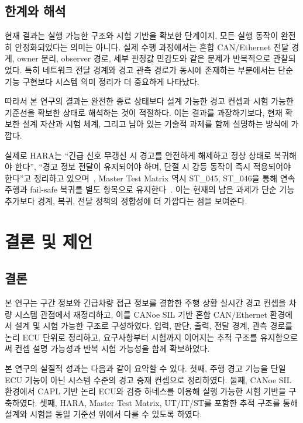 \documentclass[10pt,a4paper,twocolumn]{article}
\begin{document}
\subsection{한계와 해석}

현재 결과는 실행 가능한 구조와 시험 기반을 확보한 단계이지, 모든 실행 동작이 완전히 안정화되었다는 의미는 아니다. 실제 수행 과정에서는 혼합 CAN/Ethernet 전달 경계, owner 분리, observer 경로, 세부 판정값 민감도와 같은 문제가 반복적으로 관찰되었다. 특히 네트워크 전달 경계와 경고 관측 경로가 동시에 존재하는 부분에서는 단순 기능 구현보다 시스템 의미 정리가 더 중요하게 나타났다.

따라서 본 연구의 결과는 완전한 종료 상태보다 설계 가능한 경고 컨셉과 시험 가능한 기준선을 확보한 상태로 해석하는 것이 적절하다. 이는 결과를 과장하기보다, 현재 확보한 설계 자산과 시험 체계, 그리고 남아 있는 기술적 과제를 함께 설명하는 방식에 가깝다.

실제로 HARA는 ``긴급 신호 무갱신 시 경고를 안전하게 해제하고 정상 상태로 복귀해야 한다'', ``경고 정보 전달이 유지되어야 하며, 단절 시 강등 동작이 즉시 적용되어야 한다''고 정리하고 있으며~\cite{hara}, Master Test Matrix 역시 ST\_045, ST\_046을 통해 연속 주행과 fail-safe 복귀를 별도 항목으로 유지한다~\cite{master_test_matrix}. 이는 현재의 남은 과제가 단순 기능 추가보다 경계, 복귀, 전달 정책의 정합성에 더 가깝다는 점을 보여준다.

\section{결론 및 제언}

\subsection{결론}

본 연구는 구간 정보와 긴급차량 접근 정보를 결합한 주행 상황 실시간 경고 컨셉을 차량 시스템 관점에서 재정리하고, 이를 CANoe SIL 기반 혼합 CAN/Ethernet 환경에서 설계 및 시험 가능한 구조로 구성하였다. 입력, 판단, 출력, 전달 경계, 관측 경로를 논리 ECU 단위로 정리하고, 요구사항부터 시험까지 이어지는 추적 구조를 유지함으로써 컨셉 설명 가능성과 반복 시험 가능성을 함께 확보하였다.

본 연구의 실질적 성과는 다음과 같이 요약할 수 있다. 첫째, 주행 경고 기능을 단일 ECU 기능이 아닌 시스템 수준의 경고 중재 컨셉으로 정리하였다. 둘째, CANoe SIL 환경에서 CAPL 기반 논리 ECU와 검증 하네스를 이용해 실행 가능한 시험 기반을 구축하였다. 셋째, HARA, Master Test Matrix, UT/IT/ST를 포함한 추적 구조를 통해 설계와 시험을 동일 기준선 위에서 다룰 수 있도록 하였다.
\end{document}
